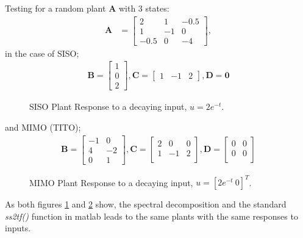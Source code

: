 \begin{flushleft}
Testing for a random plant $\bm{A}$ with 3 states: 
\begin{align*}
\bm{A} &=
\begin{bmatrix}
2 & 1 & -0.5 \\
1 & -1 & 0 \\
-0.5 & 0 & -4 
\end{bmatrix},
\end{align*}
in the case of SISO;
\begin{align*}
\bm{B} = 
\begin{bmatrix}
1 \\
0 \\
2 
\end{bmatrix},
\bm{C} = 
 \begin{bmatrix}
1 & -1 & 2 
\end{bmatrix},
\bm{D} = \bm{0}
\end{align*}
\begin{figure}
    \centering
    \begin{tikzpicture}
    
    \end{tikzpicture}
    \caption{SISO Plant Response to a decaying input, $u = 2e^{-t}$.}
    \label{siso}
\end{figure}
and MIMO (TITO);
\begin{align*}
\bm{B} = 
\begin{bmatrix}
-1 & 0 \\
4 & -2 \\
0 & 1 
\end{bmatrix},
\bm{C} = 
 \begin{bmatrix}
2 & 0 & 0 \\
1 & -1 & 2 \\
\end{bmatrix},
\bm{D} = 
 \begin{bmatrix}
0 & 0 \\
0 & 0 \\
\end{bmatrix}
\end{align*}
\begin{figure}
    \centering
    \begin{tikzpicture}
    
    \end{tikzpicture}
    \caption{MIMO Plant Response to a decaying input, $u = [2e^{-t}\: 0]^T$. }
    \label{mimo}
\end{figure}

As both figures \ref{siso} and \ref{mimo} show, the spectral decomposition and the standard \emph{ss2tf()} function in matlab leads to the same plants with the same responses to inputs.
\end{flushleft}